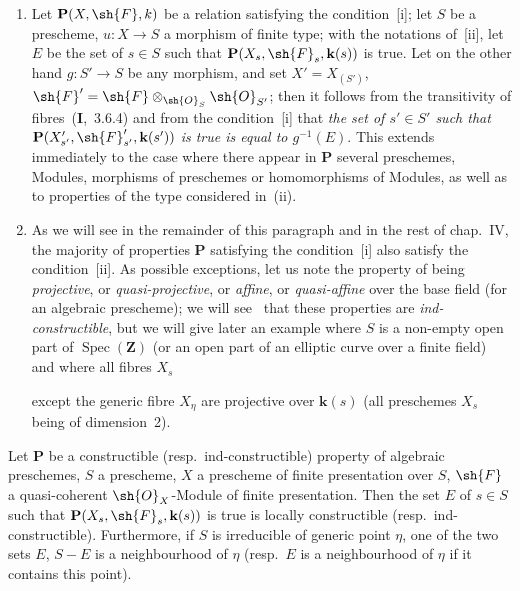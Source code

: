 \begin{remarks}[9.2.2]
\begin{enumerate}[label=(\roman*)]
  \item Let $\mathbf{P}(X,\sh{F},k)$ be a relation satisfying the condition~[i]; let $S$ be a prescheme, $u:X\to S$ a morphism of finite type; with the notations of~[ii], let $E$ be the set of $s\in S$ such that $\mathbf{P}(X_s,\sh{F}_s,\mathbf{k}(s))$ is true.
Let on the other hand $g:S'\to S$ be any morphism, and set $X'=X_{(S')}$, $\sh{F}'=\sh{F}\otimes_{\sh{O}_S}\sh{O}_{S'}$; then it follows from the transitivity of fibres~(\textbf{I},~3.6.4) and from the condition~[i] that \emph{the set of $s'\in S'$ such that $\mathbf{P}(X'_{s'},\sh{F}'_{s'},\mathbf{k}(s'))$ is true is equal to $g^{-1}(E)$}.
This extends immediately to the case where there appear in $\mathbf{P}$ several preschemes, Modules, morphisms of preschemes or homomorphisms of Modules, as well as to properties of the type considered in~(ii).

  \item As we will see in the remainder of this paragraph and in the rest of chap.~IV, the majority of properties $\mathbf{P}$ satisfying the condition~[i] also satisfy the condition~[ii].
As possible exceptions, let us note the property of being \emph{projective}, or \emph{quasi-projective}, or \emph{affine}, or \emph{quasi-affine} over the base field (for an algebraic prescheme); we will see~ that these properties are \emph{ind-constructible}, but we will give later an example where $S$ is a non-empty open part of $\operatorname{Spec}(\mathbf{Z})$ (or an open part of an elliptic curve over a finite field) and where all fibres $X_s$

except the generic fibre $X_\eta$ are projective over $\mathbf{k}(s)$ (all preschemes $X_s$ being of dimension~2).
\end{enumerate}
\end{remarks}

\begin{proposition}[9.2.3]
\label{IV.9.2.3}
Let $\mathbf{P}$ be a constructible \textnormal{(}resp.\ ind-constructible\textnormal{)} property of algebraic preschemes, $S$ a prescheme, $X$ a prescheme of finite presentation over $S$, $\sh{F}$ a quasi-coherent $\sh{O}_X$-Module of finite presentation.
Then the set $E$ of $s\in S$ such that $\mathbf{P}(X_s,\sh{F}_s,\mathbf{k}(s))$ is true is locally constructible \textnormal{(}resp.\ ind-constructible\textnormal{)}.
Furthermore, if $S$ is irreducible of generic point $\eta$, one of the two sets $E$, $S-E$ is a neighbourhood of $\eta$ \textnormal{(}resp.\ $E$ is a neighbourhood of $\eta$ if it contains this point\textnormal{)}.
\end{proposition}

